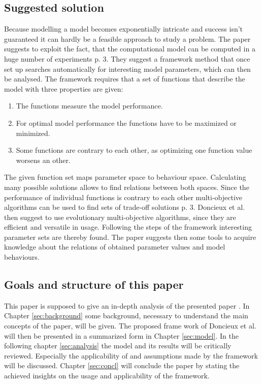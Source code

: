 \documentclass[12pt,twoside]{article}
\theoremstyle{plain}
\theoremstyle{definition}
\theoremstyle{remark}
\begin{document}
\subsection{Suggested solution}
Because modelling a model becomes exponentially intricate and success isn't guaranteed it can hardly be a feasible approach to study a problem. The paper suggests to exploit the fact, that the computational model can be computed in a \glqq huge number of experiments\grqq{} \cite{doncieux2015multi} p. 3.
They suggest a framework method that once set up searches automatically for interesting model parameters, which can then be analysed.
The framework requires that a set of functions that describe the model with three properties are given:
\begin{enumerate}
	\item The functions measure the model performance.
	\item For optimal model performance the functions have to be maximized or minimized.
	\item Some functions are contrary to each other, as optimizing one function value worsens an other.
\end{enumerate}
The given function set maps parameter space to behaviour space. Calculating many possible solutions allows to find relations between both spaces.
Since the performance of individual functions is contrary to each other multi-objective algorithms can be used to find sets of trade-off solutions \cite{doncieux2015multi} p. 3.
Doncieux et al. then suggest to use evolutionary multi-objective algorithms, since they are efficient and versatile in usage. Following the steps of the framework interesting parameter sets are thereby found.
The paper suggests then some tools to acquire knowledge about the relations of obtained parameter values and model behaviours.

\subsection{Goals and structure of this paper}
This paper is supposed to give an in-depth analysis of the presented paper \cite{doncieux2015multi}.
In Chapter \ref{sec:background} some background, necessary to understand the main concepts of the paper, will be given.
The proposed frame work of Doncieux et al. will then be presented in a summarized form in Chapter \ref{sec:model}.
In the following chapter \ref{sec:analysis} the model and its results will be critically reviewed.
Especially the applicability of and assumptions made by the framework will be discussed.
Chapter \ref{sec:concl} will conclude the paper by stating the achieved insights on the usage and applicability of the framework. 
\end{document}
